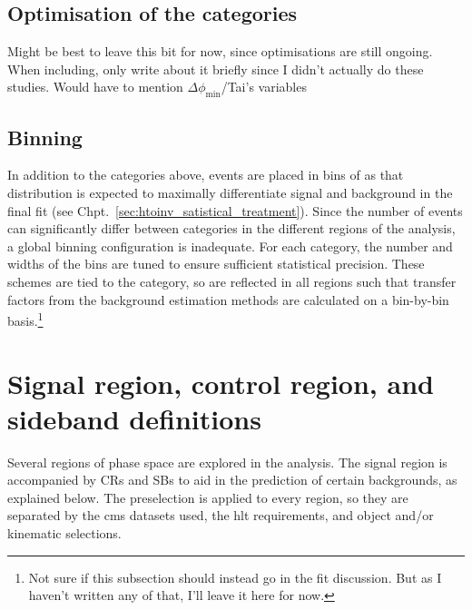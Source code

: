 

\subsection{Optimisation of the categories}
\label{subsec:htoinv_cat_optimisation}

Might be best to leave this bit for now, since optimisations are still ongoing. When including, only write about it briefly since I didn't actually do these studies. Would have to mention $\Delta\phi_{\text{min}}$/Tai's variables




\subsection{Binning}
\label{subsec:htoinv_binning}

In addition to the categories above, events are placed in bins of \ptmiss as that distribution is expected to maximally differentiate signal and background in the final fit (see Chpt.~\ref{sec:htoinv_satistical_treatment}). Since the number of events can significantly differ between categories in the different regions of the analysis, a global binning configuration is inadequate. For each category, the number and widths of the bins are tuned to ensure sufficient statistical precision. These schemes are tied to the category, so are reflected in all regions such that transfer factors from the background estimation methods are calculated on a bin-by-bin basis.\footnote{Not sure if this subsection should instead go in the fit discussion. But as I haven't written any of that, I'll leave it here for now.}




\section{Signal region, control region, and sideband definitions}
\label{sec:region_definitions}

Several regions of phase space are explored in the analysis. The signal region is accompanied by \glspl{CR} and \glspl{SB} to aid in the prediction of certain backgrounds, as explained below. The preselection is applied to every region, so they are separated by the \acrshort{cms} datasets used, the \acrlong{hlt} requirements, and object and/or kinematic selections.

